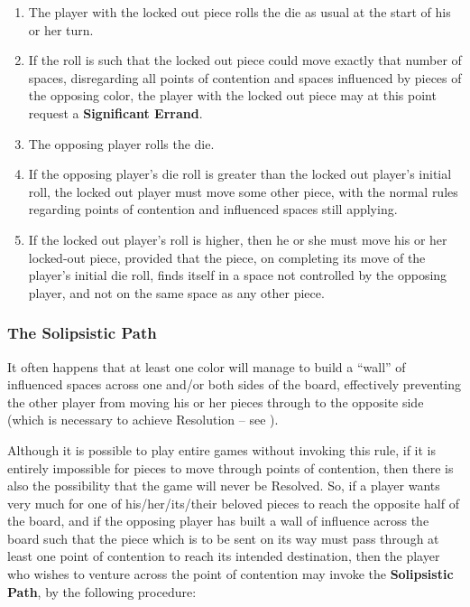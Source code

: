   \begin{enumerate}
  \item
    The player with the locked out piece rolls the die
    as usual at the start of his or her turn.

  \item
    If the roll is such that the locked out piece could move exactly
    that number of spaces, disregarding all points of contention and
    spaces influenced by pieces of the opposing color, the player
    with the locked out piece may at this point request a
    {\bf Significant Errand}.

  \item
    The opposing player rolls the die.

  \item
    If the opposing player's die roll is greater than the locked
    out player's initial roll, the locked out player must move
    some other piece, with the normal rules regarding points of
    contention and influenced spaces still applying.

  \item
    If the locked out player's roll is higher, then he or she must
    move his or her locked-out piece, provided that the piece, on completing its move
    of the player's initial die roll, finds itself in a space not
    controlled by the opposing player, and not on the same space as
    any other piece.
  \end{enumerate}


\subsubsection{The Solipsistic Path}\label{sopath}

It often happens that at least one color will manage to build a
``wall'' of influenced spaces across one and/or both sides of the board,
effectively preventing the other player from moving his or her pieces
through to the opposite side
(which is necessary to achieve Resolution -- see ).

Although it is possible to play entire games without invoking this rule, if it is
entirely impossible for pieces to move through points of contention, then there
is also the possibility that the game will never be Resolved.  So, if a player
wants very much for one of his/her/its/their beloved pieces to reach the opposite
half of the board, and if the opposing player has built a wall of influence
across the board such that the piece which is to be sent on its way must pass
through at least one point of contention to reach its intended destination,
then the player who wishes to venture across the point of contention may
invoke the {\bf Solipsistic Path}, by the following procedure:

